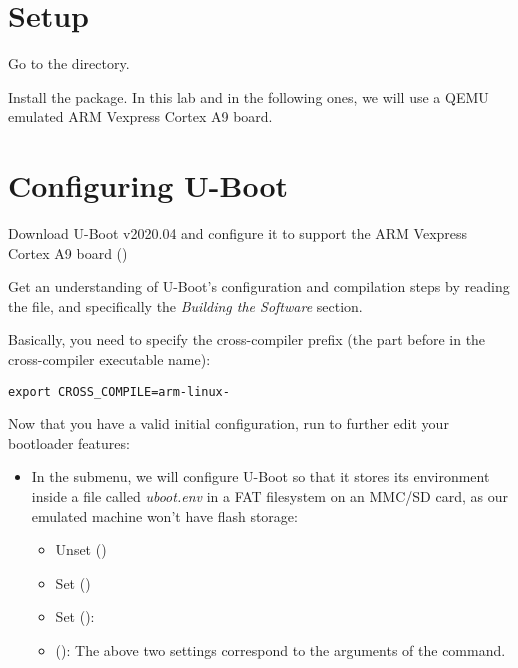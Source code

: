 
\section{Setup}

Go to the  directory.

Install the  package. In this lab and in the
following ones, we will use a QEMU emulated ARM Vexpress Cortex A9 board.

\section{Configuring U-Boot}

Download U-Boot v2020.04 and configure it
to support the ARM Vexpress Cortex A9 board
()

Get an understanding of U-Boot's configuration and compilation steps
by reading the  file, and specifically the {\em Building
the Software} section.

Basically, you need to specify the cross-compiler prefix
(the part before  in the cross-compiler executable name):
\begin{verbatim}
export CROSS_COMPILE=arm-linux-
\end{verbatim}

Now that you have a valid initial configuration, run 
to further edit your bootloader features:

\begin{itemize}
\item In the  submenu, we will configure U-Boot so
    that it stores its environment inside a file called {\em
    uboot.env} in a FAT filesystem on an MMC/SD card, as our emulated
    machine won't have flash storage:
    \begin{itemize}
    \item Unset  ()
    \item Set  ()
    \item Set  (): 
    \item {} (): \newline
        The above two settings correspond to the arguments of the
         command.
    \end{itemize}
\end{itemize}

